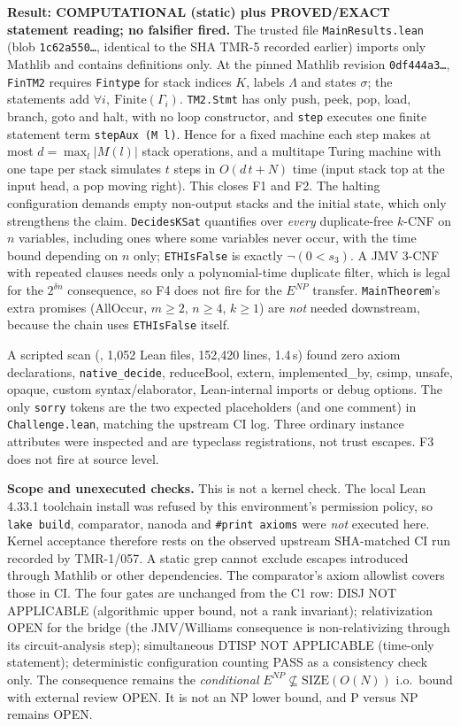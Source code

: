 \documentclass[11pt]{article}
\begin{document}
\textbf{Result: COMPUTATIONAL (static) plus PROVED/EXACT statement
reading; no falsifier fired.} The trusted file \texttt{MainResults.lean}
(blob \texttt{1c62a550\ldots}, identical to the SHA TMR-5 recorded earlier) imports only Mathlib and
contains definitions only. At the pinned Mathlib revision
\texttt{0df444a3\ldots}, \texttt{FinTM2} requires
\texttt{Fintype} for stack indices \(K\), labels \(\Lambda\) and states
\(\sigma\); the statements add \(\forall i,\ \mathrm{Finite}(\Gamma_i)\).
\texttt{TM2.Stmt} has only push, peek, pop, load, branch, goto and halt,
with no loop constructor, and \texttt{step} executes one finite
statement term \texttt{stepAux (M l)}. Hence for a fixed machine
each step makes at most \(d=\max_l|M(l)|\) stack operations, and a
multitape Turing machine with one tape per stack simulates
\(t\) steps in \(O(d\,t+N)\) time (input stack top at the input
head, a pop moving right). This closes F1 and F2. The halting
configuration demands empty non-output stacks and the initial state,
which only strengthens the claim. \texttt{DecidesKSat} quantifies over
\emph{every} duplicate-free \(k\)-CNF on \(n\) variables, including
ones where some variables never occur, with the time bound depending
on \(n\) only; \texttt{ETHIsFalse} is exactly \(\neg(0<s_3)\). A JMV
3-CNF with repeated clauses needs only a polynomial-time duplicate
filter, which is legal for the \(2^{\delta n}\) consequence, so F4
does not fire for the \(E^{NP}\) transfer.
\texttt{MainTheorem}'s extra promises (AllOccur, \(m\ge2\), \(n\ge4\),
\(k\ge1\)) are \emph{not} needed downstream, because the chain uses
\texttt{ETHIsFalse} itself.

A scripted scan (,
1{,}052 Lean files, 152{,}420 lines, 1.4\,s) found zero axiom
declarations, \texttt{native\_decide}, reduceBool, extern,
implemented\_by, csimp, unsafe, opaque, custom syntax/elaborator, Lean-internal
imports or debug options. The only \texttt{sorry} tokens are the two
expected placeholders (and one comment) in \texttt{Challenge.lean},
matching the upstream CI log. Three ordinary instance attributes were
inspected and are typeclass registrations, not trust escapes. F3 does
not fire at source level.

\textbf{Scope and unexecuted checks.} This is not a kernel check.
The local Lean 4.33.1 toolchain install was refused by this
environment's permission policy, so \texttt{lake build}, comparator,
nanoda and \texttt{\#print axioms} were \emph{not} executed here. Kernel
acceptance therefore rests on the observed upstream SHA-matched CI run
recorded by TMR-1/057. A static grep cannot exclude escapes introduced
through Mathlib or other dependencies. The comparator's axiom allowlist
covers those in CI. The four gates are unchanged from the C1 row:
DISJ NOT APPLICABLE (algorithmic upper bound, not a rank invariant);
relativization OPEN for the bridge (the JMV/Williams consequence is
non-relativizing through its circuit-analysis step); simultaneous DTISP
NOT APPLICABLE (time-only statement); deterministic configuration
counting PASS as a consistency check only. The consequence remains the
\emph{conditional} \(E^{NP}\not\subseteq\mathrm{SIZE}(O(N))\) i.o.\
bound with external review OPEN. It is not an NP lower bound, and
P versus NP remains OPEN.
\end{document}
